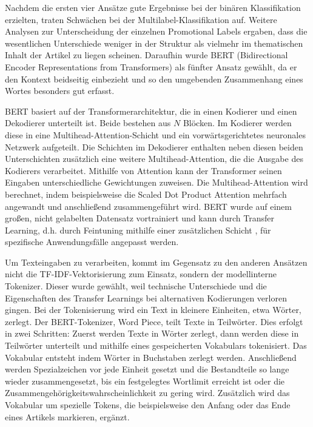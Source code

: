 Nachdem die ersten vier Ansätze gute Ergebnisse bei der binären Klassifikation erzielten, traten Schwächen bei der Multilabel-Klassifikation auf. Weitere Analysen zur Unterscheidung der einzelnen Promotional Labels ergaben, dass die wesentlichen Unterschiede weniger in der Struktur als vielmehr im thematischen Inhalt der Artikel zu liegen scheinen. Daraufhin wurde BERT (Bidirectional Encoder Representations from Transformers) als fünfter Ansatz gewählt, da er den Kontext beidseitig einbezieht und so den umgebenden Zusammenhang eines Wortes besonders gut erfasst.

BERT basiert auf der Transformerarchitektur, die in einen Kodierer und einen Dekodierer unterteilt ist. Beide bestehen aus $N$ Blöcken. Im Kodierer werden diese in eine Multihead-Attention-Schicht und ein vorwärtsgerichtetes neuronales Netzwerk aufgeteilt. Die Schichten im Dekodierer enthalten neben diesen beiden Unterschichten zusätzlich eine weitere Multihead-Attention, die die Ausgabe des Kodierers verarbeitet. Mithilfe von Attention kann der Transformer seinen Eingaben unterschiedliche Gewichtungen zuweisen. Die Multihead-Attention wird berechnet, indem beispielsweise die Scaled Dot Product Attention \cite{Vaswani2017} mehrfach angewandt und anschließend zusammengeführt wird. BERT wurde auf einem großen, nicht gelabelten Datensatz vortrainiert und kann durch Transfer Learning, d.h. durch Feintuning mithilfe einer zusätzlichen Schicht \cite{Devlin2018}, für spezifische Anwendungsfälle angepasst werden.

Um Texteingaben zu verarbeiten, kommt im Gegensatz zu den anderen Ansätzen nicht die TF-IDF-Vektorisierung zum Einsatz, sondern der modellinterne Tokenizer. Dieser wurde gewählt, weil technische Unterschiede und die Eigenschaften des Transfer Learnings bei alternativen Kodierungen verloren gingen. Bei der Tokenisierung wird ein Text in kleinere Einheiten, etwa Wörter, zerlegt. Der BERT-Tokenizer, Word Piece, teilt Texte in Teilwörter. Dies erfolgt in zwei Schritten: Zuerst werden Texte in Wörter zerlegt, dann werden diese in Teilwörter unterteilt und mithilfe eines gespeicherten Vokabulars tokenisiert. Das Vokabular entsteht indem Wörter in Buchstaben zerlegt werden. Anschließend werden Spezialzeichen vor jede Einheit gesetzt und die Bestandteile so lange wieder zusammengesetzt, bis ein festgelegtes Wortlimit erreicht ist oder die Zusammengehörigkeitswahrscheinlichkeit zu gering wird. Zusätzlich wird das Vokabular um spezielle Tokens, die beispielsweise den Anfang oder das Ende eines Artikels markieren, ergänzt.

